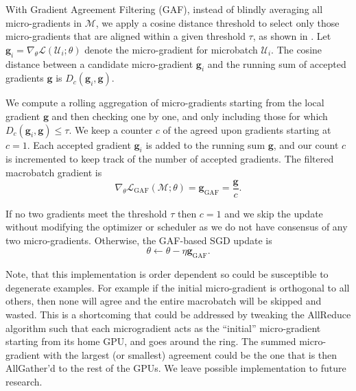 With Gradient Agreement Filtering (GAF), instead of blindly averaging all micro-gradients in $\mathcal{M}$, we apply a cosine distance threshold to select only those micro-gradients that are aligned within a given threshold $\tau$, as shown in . Let $\mathbf{g}_i = \nabla_\theta \mathcal{L}(\mathcal{U}_i; \theta)$ denote the micro-gradient for microbatch $\mathcal{U}_i$. The cosine distance between a candidate micro-gradient $\mathbf{g}_i$ and the running sum of accepted gradients $\mathbf{g}$ is $D_c(\mathbf{g}_i, \mathbf{g})$.

We compute a rolling aggregation of micro-gradients starting from the local gradient $\mathbf{g}$ and then checking one by one, and only including those for which $D_c(\mathbf{g}_i, \mathbf{g}) \leq \tau$. We keep a counter $c$ of the agreed upon gradients starting at $c = 1$. Each accepted gradient $\mathbf{g}_i$ is added to the running sum $\mathbf{g}$, and our count $c$ is incremented to keep track of the number of accepted gradients. The filtered macrobatch gradient is
\begin{equation} \label{eq:gaf_grad_update}
   \nabla_\theta \mathcal{L}_{\text{GAF}}(\mathcal{M}; \theta) = \mathbf{g}_{\text{GAF}} = \frac{\mathbf{g}}{c}.
\end{equation}

If no two gradients meet the threshold $\tau$ then $c = 1$ and we skip the update without modifying the optimizer or scheduler as we do not have consensus of any two micro-gradients. Otherwise, the GAF-based SGD update is
\begin{equation}
    \theta \leftarrow \theta - \eta \mathbf{g}_{\text{GAF}}.
\end{equation}

Note, that this implementation is order dependent so could be susceptible to degenerate examples. For example if the initial micro-gradient is orthogonal to all others, then none will agree and the entire macrobatch will be skipped and wasted. This is a shortcoming that could be addressed by tweaking the AllReduce algorithm such that each microgradient acts as the ``initial'' micro-gradient starting from its home GPU, and goes around the ring. The summed micro-gradient with the largest (or smallest) agreement could be the one that is then AllGather'd to the rest of the GPUs. We leave possible implementation to future research. 

